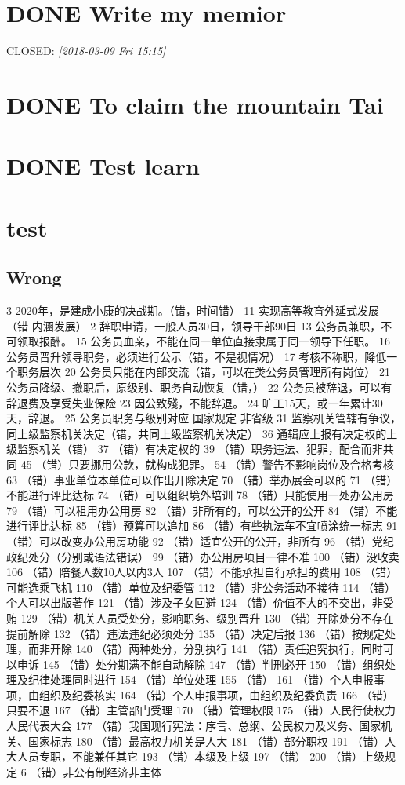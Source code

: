 \documentclass[cyan]{elegantnote}
\begin{document}
\chapter{{\bfseries\sffamily DONE} Write my memior}
\label{sec:orge3954af}
CLOSED: \textit{[2018-03-09 Fri 15:15]}
\chapter{{\bfseries\sffamily DONE} To claim the mountain Tai}
\label{sec:org87e8067}
\chapter{{\bfseries\sffamily DONE} Test learn}
\label{sec:orga5d7247}
\chapter{test}
\label{sec:orgacec8cf}
\section{Wrong}
\label{sec:org4e6bf57}
3 2020年，是建成小康的决战期。（错，时间错）
11 实现高等教育外延式发展 （错 内涵发展）
2 辞职申请，一般人员30日，领导干部90日
13 公务员兼职，不可领取报酬。
15 公务员血亲，不能在同一单位直接隶属于同一领导下任职。
16 公务员晋升领导职务，必须进行公示（错，不是视情况）
17 考核不称职，降低一个职务层次
20 公务员只能在内部交流（错，可以在类公务员管理所有岗位）
21 公务员降级、撤职后，原级别、职务自动恢复（错，）
22 公务员被辞退，可以有辞退费及享受失业保险
23 因公致殘，不能辞退。
24 旷工15天，或一年累计30天，辞退。
25 公务员职务与级别对应 国家规定 非省级
31 监察机关管辖有争议，同上级监察机关决定（错，共同上级监察机关决定）
36 通辑应上报有决定权的上级监察机关（错）
37 （错）有决定权的
39 （错）职务违法、犯罪，配合而非共同
45 （错）只要挪用公款，就构成犯罪。
54 （错）警告不影响岗位及合格考核
63 （错）事业单位本单位可以作出开除决定
70 （错）举办展会可以的
71 （错）不能进行评比达标
74 （错）可以组织境外培训
78 （错）只能使用一处办公用房
79 （错）可以租用办公用房
82 （错）非所有的，可以公开的公开
84 （错）不能进行评比达标
85 （错）预算可以追加
86 （错）有些执法车不宜喷涂统一标志
91（错）可以改变办公用房功能
92 （错）适宜公开的公开，非所有
96 （错）党纪政纪处分（分别或语法错误）
99 （错）办公用房项目一律不准
100 （错）没收卖
106 （错）陪餐人数10人以内3人
107 （错）不能承担自行承担的费用
108 （错）可能选乘飞机
110 （错）单位及纪委管
112 （错）非公务活动不接待
114 （错）个人可以出版著作
121 （错）涉及子女回避
124 （错）价值不大的不交出，非受贿
129 （错）机关人员受处分，影响职务、级别晋升
130 （错）开除处分不存在提前解除
132 （错）违法违纪必须处分
135 （错）决定后报
136 （错）按规定处理，而非开除
140 （错）两种处分，分别执行
141 （错）责任追究执行，同时可以申诉
145 （错）处分期满不能自动解除
147 （错）判刑必开
150 （错）组织处理及纪律处理同时进行
154 （错）单位处理
155 （错）
161 （错）个人申报事项，由组织及纪委核实
164 （错）个人申报事项，由组织及纪委负责
166 （错）只要不退
167 （错）主管部门受理
170 （错）管理权限
175 （错）人民行使权力人民代表大会
177 （错）我国现行宪法：序言、总纲、公民权力及义务、国家机关、国家标志
180 （错）最高权力机关是人大
181 （错）部分职权
191 （错）人大人员专职，不能兼任其它
193 （错）本级及上级
197 （错）
200 （错）上级规定
6 （错）非公有制经济非主体
\end{document}
